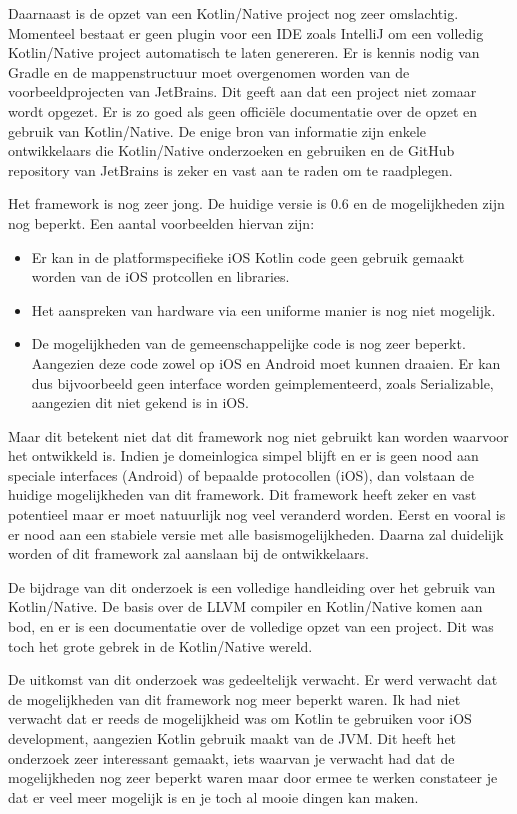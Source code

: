 Daarnaast is de opzet van een Kotlin/Native project nog zeer omslachtig. Momenteel bestaat er geen plugin voor een IDE zoals IntelliJ om een volledig Kotlin/Native project automatisch te laten genereren. Er is kennis nodig van Gradle en de mappenstructuur moet overgenomen worden van de voorbeeldprojecten van JetBrains. Dit geeft aan dat een project niet zomaar wordt opgezet. Er is zo goed als geen officiële documentatie over de opzet en gebruik van Kotlin/Native. De enige bron van informatie zijn enkele ontwikkelaars die Kotlin/Native onderzoeken en gebruiken en de GitHub repository van JetBrains is zeker en vast aan te raden om te raadplegen.

Het framework is nog zeer jong. De huidige versie is 0.6 en de mogelijkheden zijn nog beperkt. Een aantal voorbeelden hiervan zijn:
\begin{itemize}
	\item Er kan in de platformspecifieke iOS Kotlin code geen gebruik gemaakt worden van de iOS protcollen en libraries.
	\item Het aanspreken van hardware via een uniforme manier is nog niet mogelijk.
	\item De mogelijkheden van de gemeenschappelijke code is nog zeer beperkt. Aangezien deze code zowel op iOS en Android moet kunnen draaien. Er kan dus bijvoorbeeld geen interface worden geimplementeerd, zoals Serializable, aangezien dit niet gekend is in iOS.
\end{itemize}

Maar dit betekent niet dat dit framework nog niet gebruikt kan worden waarvoor het ontwikkeld is. Indien je domeinlogica simpel blijft en er is geen nood aan speciale interfaces (Android) of bepaalde protocollen (iOS), dan volstaan de huidige mogelijkheden van dit framework. Dit framework heeft zeker en vast potentieel maar er moet natuurlijk nog veel veranderd worden. Eerst en vooral is er nood aan een stabiele versie met alle basismogelijkheden. Daarna zal duidelijk worden of dit framework zal aanslaan bij de ontwikkelaars.

De bijdrage van dit onderzoek is een volledige handleiding over het gebruik van Kotlin/Native. De basis over de LLVM compiler en Kotlin/Native komen aan bod, en er is een documentatie over de volledige opzet van een project. Dit was toch het grote gebrek in de Kotlin/Native wereld.

De uitkomst van dit onderzoek was gedeeltelijk verwacht. Er werd verwacht dat de mogelijkheden van dit framework nog meer beperkt waren. Ik had niet verwacht dat er reeds de mogelijkheid was om Kotlin te gebruiken voor iOS development, aangezien Kotlin gebruik maakt van de JVM. Dit heeft het onderzoek zeer interessant gemaakt, iets waarvan je verwacht had dat de mogelijkheden nog zeer beperkt waren maar door ermee te werken constateer je dat er veel meer mogelijk is en je toch al mooie dingen kan maken.

